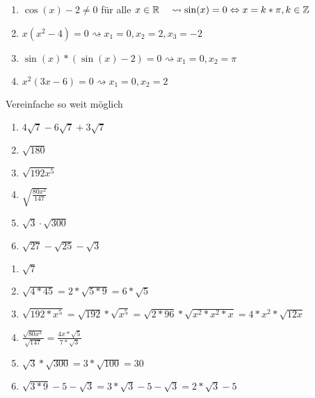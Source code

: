 \begin{lsg}{}
  \begin{enumerate}
		\item $\cos(x)-2\not = 0$ für alle $x\in \mathbb{R} \quad\rightsquigarrow \sin(x)=0 \Leftrightarrow x=k*\pi, k\in\mathbb{Z}$
    \item $x(x^2-4) = 0 \rightsquigarrow x_1=0, x_2=2, x_3=-2$
    \item $\sin(x)*(\sin(x)-2) = 0 \rightsquigarrow x_1=0, x_2=\pi$
    \item $x^2(3x-6)=0 \rightsquigarrow x_1=0, x_2=2$
  \end{enumerate}
\end{lsg}





 Vereinfache so weit möglich
\begin{multicols}{3}
  \begin{enumerate}
    \item $4\sqrt{7}-6\sqrt{7} + 3\sqrt{7}$
    \item $\sqrt{180}$
    \item $\sqrt{192x^5}$
    \item $\sqrt{\frac{80x^2}{147}}$
    \item $\sqrt{3}\cdot\sqrt{300}$
    \item $\sqrt{27}-\sqrt{25}-\sqrt{3}$
  \end{enumerate}
\end{multicols}

\begin{lsg}{}
  \begin{multicols}{3}
    \begin{enumerate}
      \item $\sqrt{7}$
      \item $\sqrt{4*45}=2*\sqrt{5*9}=6*\sqrt 5$
      \item $\sqrt{192*x^5}=\sqrt{192}*\sqrt{x^5}=\sqrt{2*96}*\sqrt{x^2*x^2*x}=4*x^2*\sqrt{12x}$
      \item $\frac{\sqrt{80x^2}}{\sqrt{147}} = \frac{4x*\sqrt{5}}{7*\sqrt{3}}$
      \item $\sqrt{3}*\sqrt{300}=3*\sqrt{100}=30$
      \item $\sqrt{3*9}-5-\sqrt{3}=3*\sqrt{3}-5-\sqrt{3}=2*\sqrt{3}-5$
    \end{enumerate}
  \end{multicols}
\end{lsg}





